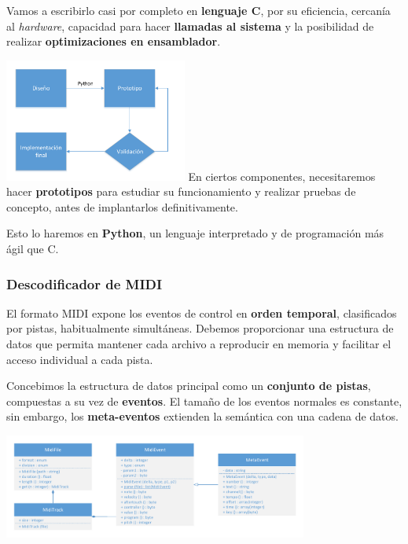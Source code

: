 \documentclass[10pt,a4paper]{article}
\begin{document}
	 Vamos a escribirlo casi por completo en \textbf{lenguaje C}, por su eficiencia, cercanía al \textit{hardware}, capacidad para hacer \textbf{llamadas al sistema} y la posibilidad de realizar \textbf{optimizaciones en ensamblador}.
	 
	 \begin{multicols}{2}
	 	\noindent
	 	\includegraphics[width=0.45\textwidth]{images/prototipado} 
	 	\columnbreak
	 	En ciertos componentes, necesitaremos hacer \textbf{prototipos} para estudiar su funcionamiento y realizar pruebas de concepto, antes de implantarlos definitivamente. 
	 	
	 	Esto lo haremos en \textbf{Python}, un lenguaje interpretado y de programación más ágil que C.
	 \end{multicols}
	
	\subsubsection*{Descodificador de MIDI}
	
	El formato MIDI expone los eventos de control en \textbf{orden temporal}, clasificados por pistas, habitualmente simultáneas. Debemos proporcionar una estructura de datos que permita mantener cada archivo a reproducir en memoria y facilitar el acceso individual a cada pista.
	
	Concebimos la estructura de datos principal como un \textbf{conjunto de pistas}, compuestas a su vez de \textbf{eventos}. El tamaño de los eventos normales es constante, sin embargo, los \textbf{meta-eventos} extienden la semántica con una cadena de datos.
	
	\begin{center}
		\includegraphics[width=0.75\textwidth]{images/uml_midi}
	\end{center}
	
\end{document}
